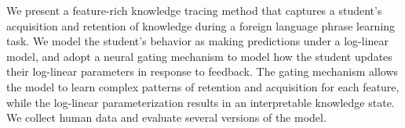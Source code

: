 We present a feature-rich knowledge tracing method that captures a student's acquisition and retention of knowledge during a foreign language phrase learning task. We model the student's behavior as making predictions under a log-linear model, and adopt a neural gating mechanism to model how the student updates their log-linear parameters in response to feedback.  The gating mechanism allows the model to learn complex patterns of retention and acquisition for each feature, while the log-linear parameterization results in an interpretable knowledge state. We collect human data and evaluate several versions of the model.
